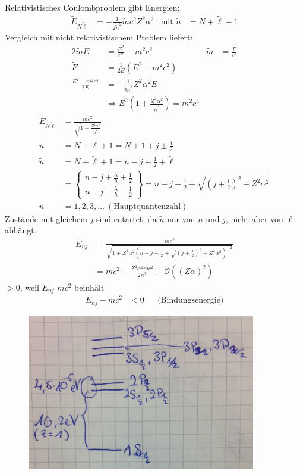 Relativistisches Coulombproblem gibt Energien:
	\begin{align*}
		\tilde{E}_{N\tilde{\ell}} &= 
		-\frac{1}{2\tilde{n}^2} \tilde{m} c^2 Z^2 \alpha^2 &\text{mit }
		\tilde{n} &= N + \tilde{\ell} + 1
	\end{align*}
Vergleich mit nicht relativistischem Problem liefert:
	\begin{align*}
		2 \tilde{m} \tilde{E} &= \frac{E^2}{c^2} -m^2 c^2 &
		\tilde{m} &= \frac{E}{c^2} \\
		\tilde{E} &= \frac{1}{2E} (E^2 - m^2 c^2) \\
		\frac{E^2 - m^2 c^4}{2E} &= -\frac{1}{2 \tilde{n}^2} Z^2 \alpha^2 E \\
		&\Rightarrow E^2 \left( 1 + \frac{Z^2 \alpha^2}{\tilde{n}^2}\right) 
		= m^2 c^4
	\end{align*}
	\begin{align*}
		E_{N \tilde{\ell}} &= \frac{mc^2}{\sqrt{1 + \frac{Z^2 \alpha^2}{\tilde{n}^2}}} \\
		n &= N + \ell + 1 = N + 1 + j \pm \frac{1}{2} \\
		\tilde{n} &= N + \tilde{\ell} + 1 = n - j \mp \frac{1}{2} + \tilde{\ell}\\
		&= \left\{
			\begin{aligned}
				n - j + \frac{\lambda}{\hbar} + \frac{1}{2} \\
				n - j - \frac{\lambda}{\hbar} - \frac{1}{2}
			\end{aligned}
		\right\} 
		= n - j - \frac{1}{2}+ \sqrt{\left(j + \frac{1}{2}\right)^2 - Z^2 \alpha^2} \\
		n &= 1, 2, 3, \ldots ~(\text{Hauptquantenzahl})
	\end{align*}
Zustände mit gleichem $j$ sind entartet, da $\tilde{n}$ nur von $n$ und $j$, nicht aber von $\ell$ abhängt.
	\begin{align*}
		E_{nj} &= \frac{mc^2}{\sqrt{1 + Z^2 \alpha^2 \left(n - j -\frac{1}{2} + \sqrt{\left(j + \frac{1}{2}\right)^2 - Z^2 \alpha^2}\right)^{-2}}} \\
		&= mc^2 - \frac{Z^2 \alpha^2 m c^2}{2 n^2} + \mathscr{O} ((Z\alpha)^2)
	\end{align*}
$>0$, weil $E_{nj}$ $mc^2$ beinhält
	\begin{align*}
		E_{nj} - mc^2 &< 0 & &\text{(Bindungsenergie)}
	\end{align*}
	\begin{figure} [h]
		\begin{center}
			\includegraphics[width=10cm]{Relativistisches_Coulombproblem1}
		\end{center}
	\end{figure}
